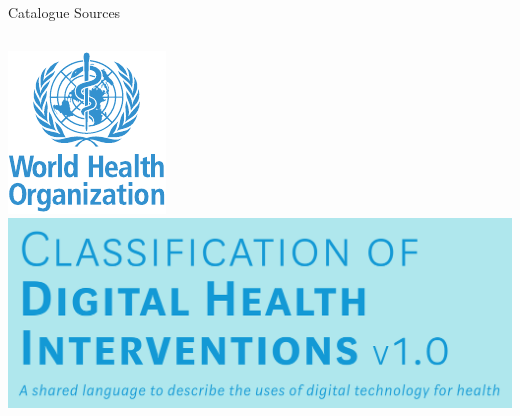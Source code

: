 \documentclass[aspectratio=1610,12pt]{beamer}
\begin{document}
\begin{frame}{Catalogue Sources}
  \begin{columns}
    \includegraphics[width=\textwidth]{img/WHOLogo.pdf}
    \includegraphics[width=\textwidth]{img/dhi.png}
\end{columns}
\end{frame}
\end{document}
